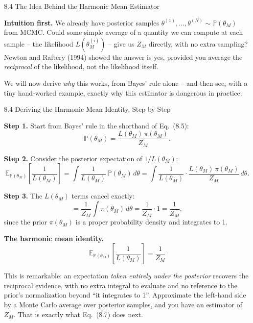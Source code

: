\documentclass[aspectratio=169,10pt]{beamer}
\begin{document}
\begin{frame}[allowframebreaks]{8.4 The Idea Behind the Harmonic Mean Estimator}

\textbf{Intuition first.} We already have posterior samples $\theta^{(1)}, \dots, \theta^{(N)} \sim \mathbb{P}(\theta_M)$ from MCMC. Could some simple average of a quantity we can compute at each sample -- the likelihood $L(\theta^{(i)}_M)$ -- give us $Z_M$ directly, with no extra sampling? Newton and Raftery (1994) showed the answer is yes, provided you average the \emph{reciprocal} of the likelihood, not the likelihood itself.

We will now derive \emph{why} this works, from Bayes' rule alone -- and then see, with a tiny hand-worked example, exactly why this estimator is dangerous in practice.

\end{frame}

\begin{frame}[allowframebreaks]{8.4 Deriving the Harmonic Mean Identity, Step by Step}

\textbf{Step 1.} Start from Bayes' rule in the shorthand of Eq.\ (8.5):
\[
\mathbb{P}(\theta_M) = \frac{L(\theta_M)\,\pi(\theta_M)}{Z_M}.
\]

\textbf{Step 2.} Consider the posterior expectation of $1/L(\theta_M)$:
\[
\mathbb{E}_{\mathbb{P}(\theta_M)}\!\left[\frac{1}{L(\theta_M)}\right]
= \int \frac{1}{L(\theta_M)}\, \mathbb{P}(\theta_M)\, d\theta
= \int \frac{1}{L(\theta_M)} \cdot \frac{L(\theta_M)\,\pi(\theta_M)}{Z_M}\, d\theta.
\]

\textbf{Step 3.} The $L(\theta_M)$ terms cancel exactly:
\[
= \frac{1}{Z_M} \int \pi(\theta_M)\, d\theta = \frac{1}{Z_M} \cdot 1 = \frac{1}{Z_M},
\]
since the prior $\pi(\theta_M)$ is a proper probability density and integrates to 1.

\framebreak

\textbf{The harmonic mean identity.}
\[
\boxed{\ \mathbb{E}_{\mathbb{P}(\theta_M)}\!\left[\frac{1}{L(\theta_M)}\right] = \frac{1}{Z_M}\ }
\]

This is remarkable: an expectation \emph{taken entirely under the posterior} recovers the reciprocal evidence, with no extra integral to evaluate and no reference to the prior's normalization beyond ``it integrates to 1''. Approximate the left-hand side by a Monte Carlo average over posterior samples, and you have an estimator of $Z_M$. That is exactly what Eq.\ (8.7) does next.

\end{frame}
\end{document}
